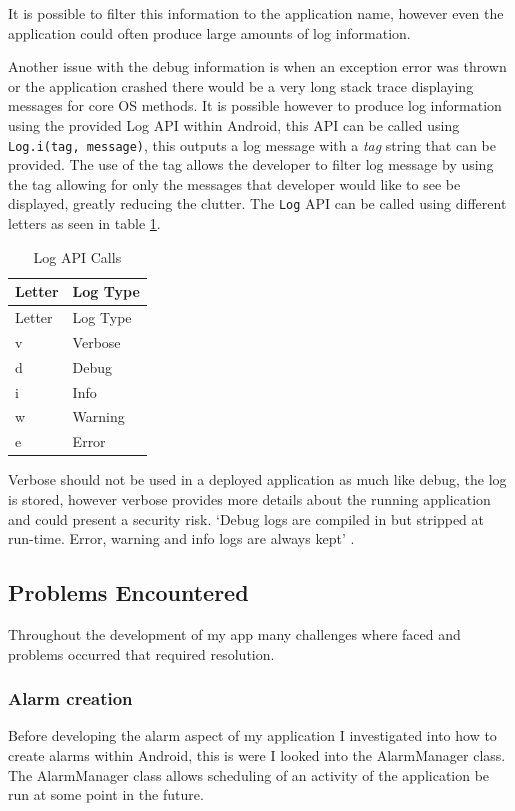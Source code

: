 It is possible to filter this information to the application name,
however even the application could often produce large amounts of log
information.

Another issue with the debug information is when an exception error was
thrown or the application crashed there would be a very long stack trace
displaying messages for core OS methods. It is possible however to
produce log information using the provided Log API within Android, this
API can be called using \lstinline!Log.i(tag, message)!, this outputs a
log message with a \emph{tag} string that can be provided. The use of
the tag allows the developer to filter log message by using the tag
allowing for only the messages that developer would like to see be
displayed, greatly reducing the clutter. The \lstinline!Log! API can be
called using different letters as seen in table \ref{table:logkey}.

\begin{longtable}[]{@{}ll@{}}
\caption{Log API Calls \label{table:logkey}}\tabularnewline
\toprule
Letter & Log Type\tabularnewline
\midrule
\endfirsthead
\toprule
Letter & Log Type\tabularnewline
\midrule
\endhead
v & Verbose\tabularnewline
d & Debug\tabularnewline
i & Info\tabularnewline
w & Warning\tabularnewline
e & Error\tabularnewline
\bottomrule
\end{longtable}

Verbose should not be used in a deployed application as much like debug,
the log is stored, however verbose provides more details about the
running application and could present a security risk. `Debug logs are
compiled in but stripped at run-time. Error, warning and info logs are
always kept' \parencite{androidLog}.

\subsection{Problems Encountered}\label{problems-encountered}

Throughout the development of my app many challenges where faced and
problems occurred that required resolution.

\subsubsection{Alarm creation}\label{alarm-creation}

Before developing the alarm aspect of my application I investigated into
how to create alarms within Android, this is were I looked into the
AlarmManager class. The AlarmManager class allows scheduling of an
activity of the application be run at some point in the future.

